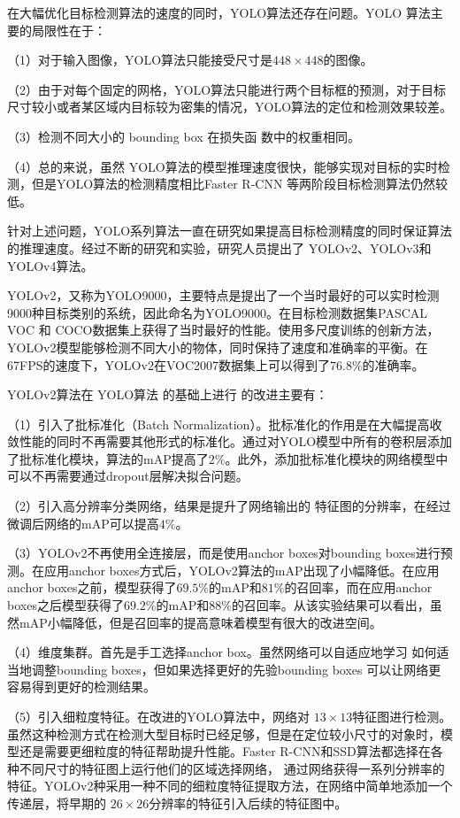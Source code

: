 在大幅优化目标检测算法的速度的同时，YOLO算法还存在问题。YOLO 算法主要的局限性在于：

（1）对于输入图像，YOLO算法只能接受尺寸是$448 \times 448$的图像。

（2）由于对每个固定的网格，YOLO算法只能进行两个目标框的预测，对于目标尺寸较小或者某区域内目标较为密集的情况，YOLO算法的定位和检测效果较差。

（3）检测不同大小的 bounding box 在损失函
数中的权重相同。

（4）总的来说，虽然 YOLO算法的模型推理速度很快，能够实现对目标的实时检测，但是YOLO算法的检测精度相比Faster R-CNN 等两阶段目标检测算法仍然较低。

针对上述问题，YOLO系列算法一直在研究如果提高目标检测精度的同时保证算法的推理速度。经过不断的研究和实验，研究人员提出了 YOLOv2\cite{redmon2017yolo9000}、YOLOv3\cite{redmon2018yolov3}和YOLOv4\cite{AlexeyBochkovskiy2020YOLOv4OS}算法。

YOLOv2，又称为YOLO9000，主要特点是提出了一个当时最好的可以实时检测9000种目标类别的系统，因此命名为YOLO9000。在目标检测数据集PASCAL VOC 和 COCO数据集上获得了当时最好的性能。使用多尺度训练的创新方法，YOLOv2模型能够检测不同大小的物体，同时保持了速度和准确率的平衡。在67FPS的速度下，YOLOv2在VOC2007数据集上可以得到了$76.8\%$的准确率。

YOLOv2算法在 YOLO算法 的基础上进行
的改进主要有：

（1）引入了批标准化（Batch Normalization）。批标准化的作用是在大幅提高收敛性能的同时不再需要其他形式的标准化。通过对YOLO模型中所有的卷积层添加了批标准化模块，算法的mAP提高了$2\%$。此外，添加批标准化模块的网络模型中可以不再需要通过dropout层解决拟合问题。

（2）引入高分辨率分类网络，结果是提升了网络输出的 特征图的分辨率，在经过微调后网络的mAP可以提高$4\%$。

（3）YOLOv2不再使用全连接层，而是使用anchor boxes对bounding boxes进行预测。在应用anchor boxes方式后，YOLOv2算法的mAP出现了小幅降低。在应用anchor boxes之前，模型获得了$69.5\%$的mAP和$81\%$的召回率，而在应用anchor boxes之后模型获得了$69.2\%$的mAP和$88\%$的召回率。从该实验结果可以看出，虽然mAP小幅降低，但是召回率的提高意味着模型有很大的改进空间。

（4）维度集群。首先是手工选择anchor box。虽然网络可以自适应地学习
如何适当地调整bounding boxes，但如果选择更好的先验bounding boxes
可以让网络更容易得到更好的检测结果。

（5）引入细粒度特征。在改进的YOLO算法中，网络对
$13\times13$特征图进行检测。虽然这种检测方式在检测大型目标时已经足够，但是在定位较小尺寸的对象时，模型还是需要更细粒度的特征帮助提升性能。Faster R-CNN和SSD算法都选择在各种不同尺寸的特征图上运行他们的区域选择网络，
通过网络获得一系列分辨率的特征。YOLOv2种采用一种不同的细粒度特征提取方法，在网络中简单地添加一个传递层，将早期的
$26\times26$分辨率的特征引入后续的特征图中。

